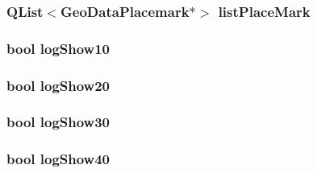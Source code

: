 \hypertarget{a00008_a3745ca16b8b48ceefc6ea9a809ecb6f1}{
\subsubsection[{list\-Place\-Mark}]{\setlength{\rightskip}{0pt plus 5cm}Q\-List$<$Geo\-Data\-Placemark$\ast$$>$ list\-Place\-Mark\hspace{0.3cm}{\ttfamily [private]}}}\label{a00008_a3745ca16b8b48ceefc6ea9a809ecb6f1}
\hypertarget{a00008_a9a99ef269d152d9109dc5ec3365a0c4f}{
\subsubsection[{log\-Show10}]{\setlength{\rightskip}{0pt plus 5cm}bool log\-Show10\hspace{0.3cm}{\ttfamily [private]}}}\label{a00008_a9a99ef269d152d9109dc5ec3365a0c4f}
\hypertarget{a00008_aaa75290829eb1659effdf2bb7d0b0122}{
\subsubsection[{log\-Show20}]{\setlength{\rightskip}{0pt plus 5cm}bool log\-Show20\hspace{0.3cm}{\ttfamily [private]}}}\label{a00008_aaa75290829eb1659effdf2bb7d0b0122}
\hypertarget{a00008_adc5f0ca2ddba7e52119b6f23ec7c7922}{
\subsubsection[{log\-Show30}]{\setlength{\rightskip}{0pt plus 5cm}bool log\-Show30\hspace{0.3cm}{\ttfamily [private]}}}\label{a00008_adc5f0ca2ddba7e52119b6f23ec7c7922}
\hypertarget{a00008_a69c10d3146f1a21e3a2291d272872b3e}{
\subsubsection[{log\-Show40}]{\setlength{\rightskip}{0pt plus 5cm}bool log\-Show40\hspace{0.3cm}{\ttfamily [private]}}}\label{a00008_a69c10d3146f1a21e3a2291d272872b3e}
